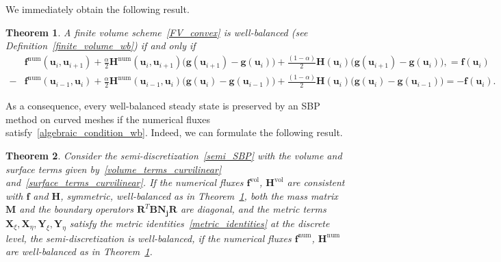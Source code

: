 \documentclass[]{scrartcl}
\newcommand{\mtx}[1]{\boldsymbol{#1}}
\renewcommand{\vec}[1]{\boldsymbol{#1}}
\newtheorem{theorem}{Theorem}[section]
\theoremstyle{definition}
\begin{document}
We immediately obtain the following result.
\begin{theorem}
    \label{well_balanced_fluxes}
A finite volume scheme~\eqref{FV_convex} is well-balanced (see Definition~\ref{finite_volume_wb}) if and only if
\begin{equation}
    \begin{aligned}
    &\vec{f}^{\mathrm{num}} (\vec{u}_i, \vec{u}_{i+1})
    + \frac{\alpha}{2}\vec{H}^{\mathrm{num}}(\vec{u}_i, \vec{u}_{i+1})
    \bigl(\vec{g}(\vec{u}_{i+1}) - \vec{g}(\vec{u}_{i})\bigr) + \frac{(1-\alpha)}{2}\vec{H}(\vec{u}_i) \bigl( \vec{g}(\vec{u}_{i+1}) - \vec{g}(\vec{u}_{i}) \bigr ),
    = \vec{f}(\vec{u}_i) \\
    -&\vec{f}^{\mathrm{num}} (\vec{u}_{i-1}, \vec{u}_i)
    + \frac{\alpha}{2}\vec{H}^{\mathrm{num}}(\vec{u}_{i-1}, \vec{u}_{i})
    \bigl(\vec{g}(\vec{u}_{i}) - \vec{g}(\vec{u}_{i-1})\bigr) + \frac{(1-\alpha)}{2}\vec{H}(\vec{u}_i) \bigl( \vec{g}(\vec{u}_{i}) - \vec{g}(\vec{u}_{i-1}) \bigr )
    = -\vec{f}(\vec{u}_{i}).
    \end{aligned}
\end{equation}
\end{theorem}
As a consequence, every well-balanced steady state is preserved by an SBP method on curved meshes if the numerical fluxes satisfy~\eqref{algebraic_condition_wb}. Indeed, we can formulate the following result.
\begin{theorem}
    \label{th:wb_curvilinear}
    Consider the semi-discretization~\eqref{semi_SBP} with the volume and surface terms given by~\eqref{volume_terms_curvilinear} and~\eqref{surface_terms_curvilinear}.
    If the numerical fluxes $\vec{f}^{\mathrm{vol}}$, $\vec{H}^{\mathrm{vol}}$ are consistent with $\vec{f}$ and $\vec{H}$, symmetric, well-balanced as in Theorem~\ref{well_balanced_fluxes}, both the mass matrix $\mtx{M}$ and the boundary operators $\mtx{R}^T \mtx{B} \mtx{N_j} \mtx{R}$ are diagonal, and the metric terms $\vec{X}_\xi, \vec{X}_\eta, \vec{Y}_\xi, \vec{Y}_\eta$ satisfy the metric identities~\eqref{metric_identities} at the discrete level, the semi-discretization is well-balanced, if the numerical fluxes $\vec{f}^{\mathrm{num}}$, $\vec{H}^{\mathrm{num}}$ are well-balanced as in Theorem~\ref{well_balanced_fluxes}.
\end{theorem}
\end{document}
